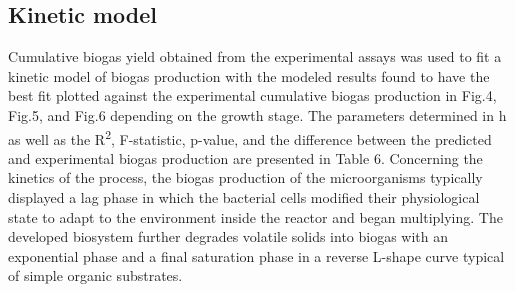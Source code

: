 \subsection{Kinetic model}
Cumulative biogas yield obtained from the experimental assays was used to fit a kinetic model of biogas production with the modeled results found to have the best fit plotted against the experimental cumulative biogas production in Fig.4, Fig.5, and Fig.6 depending on the growth stage. The parameters determined in h as well as the R\textsuperscript{2}, F-statistic, p-value, and the difference between the predicted and experimental biogas production are presented in Table 6.
Concerning the kinetics of the process, the biogas production of the microorganisms typically displayed a lag phase in which the bacterial cells modified their physiological state to adapt to the environment inside the reactor and began multiplying. The developed biosystem further degrades volatile solids into biogas with an exponential phase and a final saturation phase in a reverse L-shape curve typical of simple organic substrates.    